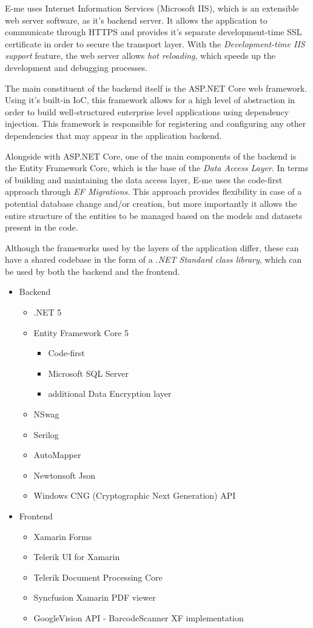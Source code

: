 E-me uses Internet Information Services (Microsoft IIS), which is an extensible web server software, as it's backend server.
It allows the application to communicate through HTTPS and provides it's separate development-time SSL certificate in order to secure the transport
layer. With the \emph{Development-time IIS support} feature, the web server allows \emph{hot reloading}, which speeds up the development and debugging
processes.

The main constituent of the backend itself is the ASP.NET Core web framework.
Using it's built-in IoC, this framework allows for a high level of abstraction in order to build well-structured enterprise level applications
using dependency injection.
This framework is responsible for registering and configuring any other dependencies that may appear in the application backend.

Alongside with ASP.NET Core, one of the main components of the backend is the Entity Framework Core, which is the base of the 
\emph{Data Access Layer}.
In terms of building and maintaining the data access layer, E-me uses the code-first approach through \emph{EF Migrations}.
This approach provides flexibility in case of a potential database change and/or creation, but more importantly it allows 
the entire structure of the entities to be managed based on the models and datasets present in the code.

Although the frameworks used by the layers of the application differ, these can have a shared codebase in the form
of a \emph{.NET Standard class library}, which can be used by both the backend and the frontend.

\begin{itemize}
	\item Backend
	\begin{itemize}
		\item .NET 5
		\item Entity Framework Core 5
		\begin{itemize}
			\item Code-first
			\item Microsoft SQL Server
			\item additional Data Encryption layer
		\end{itemize}
		\item NSwag
		\item Serilog
		\item AutoMapper
		\item Newtonsoft Json
		\item Windows CNG (Cryptographic Next Generation) API
	\end{itemize}
	\item Frontend
	\begin{itemize}
		\item Xamarin Forms
		\item Telerik UI for Xamarin
		\item Telerik Document Processing Core
		\item Syncfusion Xamarin PDF viewer
		\item GoogleVision API - BarcodeScanner XF implementation
	\end{itemize}
\end{itemize}

